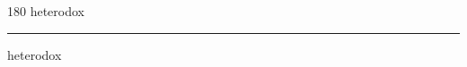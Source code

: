 
\begin{frame}
\begin{center}
\begin{turn}{180}
{\fontsize{2.5cm}{1em}\selectfont heterodox}
\end{turn}
\vspace{1em}\par  
\hrule
\vspace{1em}\par  
{\fontsize{2.5cm}{1em}\selectfont heterodox}
\end{center}
\end{frame}
